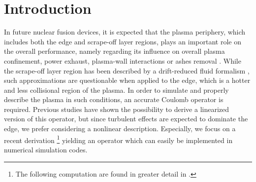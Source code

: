 \section{Introduction}


In future nuclear fusion devices, it is expected that the plasma periphery, which includes both the edge and scrape-off layer regions, plays an important role on the overall performance, namely regarding its influence on overall plasma confinement, power exhaust, plasma-wall interactions or ashes removal
.
While the scrape-off layer region has been described by a drift-reduced fluid formalism
, such approximations are questionable when applied to the edge, which is a hotter and less collisional region of the plasma.
In order to simulate and properly describe the plasma in such conditions, an accurate Coulomb operator is required. Previous studies
have shown the possibility to derive a linearized version of this operator, but since turbulent effects are expected to dominate the edge, we prefer considering a nonlinear description. Especially, we focus on a recent derivation
\footnote{The following computation are found in greater detail in
.}
yielding an operator which can easily be implemented in numerical simulation codes.


